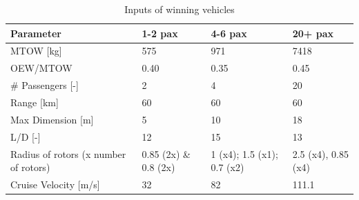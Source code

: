 \begin{table}[H]
\centering
\captionsetup{justification=centering}
\caption{Inputs of winning vehicles}
\label{inputswin}
\begin{tabular}{llll}
\hline
\textbf{Parameter}                    & \textbf{1-2 pax}      & \textbf{4-6 pax} & \textbf{20+ pax}    \\ \hline
MTOW {[}kg{]}                         & 575                   &    971              & 7418                \\
OEW/MTOW        & 0.40                    &   0.35          & 0.45                  \\
\# Passengers {[}-{]}                 & 2                     &      4            & 20                  \\
Range {[}km{]}                        & 60                    &       60           & 60                  \\
Max Dimension {[}m{]}                 & 5                     &      10            & 18                  \\
L/D {[}-{]}                           & 12                    &       15           & 13                  \\
Radius of rotors (x number of rotors) & 0.85 (2x) \& 0.8 (2x) &    1 (x4); 1.5 (x1); 0.7 (x2)             & 2.5 (x4), 0.85 (x4) \\
Cruise Velocity {[}m/s{]}             & 32                    &        82          & 111.1               \\ \hline
\end{tabular}
\end{table}

